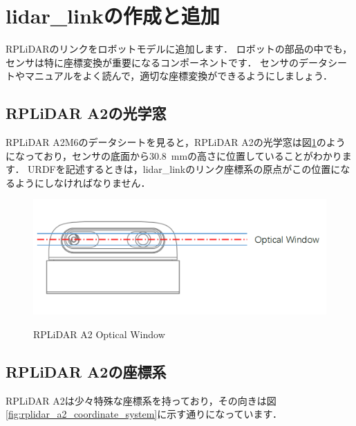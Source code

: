 \documentclass[{../../master}]{subfiles}
\begin{document}
\section{\textsf{lidar\_link}の作成と追加}
\label{sec:add_lidar_link}

RPLiDARのリンクをロボットモデルに追加します．
ロボットの部品の中でも，センサは特に座標変換が重要になるコンポーネントです．
センサのデータシートやマニュアルをよく読んで，適切な座標変換ができるようにしましょう．

\subsection{RPLiDAR A2の光学窓}

RPLiDAR A2M6のデータシートを見ると，RPLiDAR A2の光学窓は図\ref{fig:rplidar_a2_optical_window}のようになっており，センサの底面から\SI{30.8}{mm}の高さに位置していることがわかります．
URDFを記述するときは，\textsf{lidar\_link}のリンク座標系の原点がこの位置になるようにしなければなりません．

\begin{figure}[ht]
  \centering
  \includegraphics[width=100truemm]{images/rplidar_a2_optical_window.png}
  \label{fig:rplidar_a2_optical_window}
  \caption{RPLiDAR A2 Optical Window}
\end{figure}

\subsection{RPLiDAR A2の座標系}

RPLiDAR A2は少々特殊な座標系を持っており，その向きは図\ref{fig:rplidar_a2_coordinate_system}に示す通りになっています．
\end{document}

